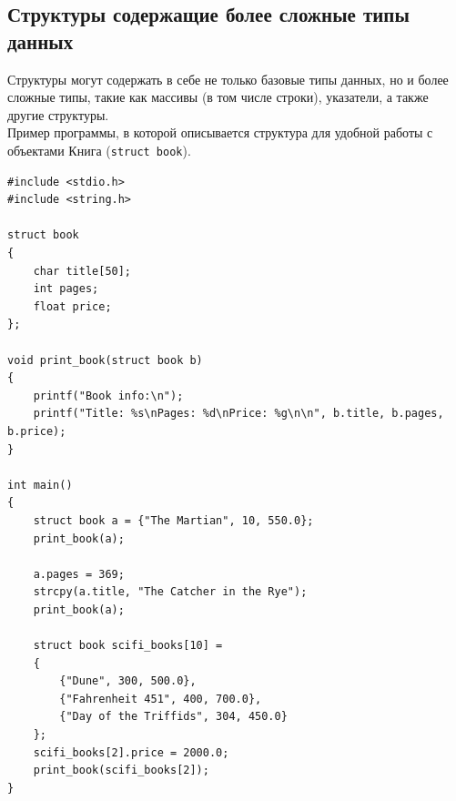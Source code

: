 \documentclass{article}
\begin{document}
\subsection*{Структуры содержащие более сложные типы данных}
Структуры могут содержать в себе не только базовые типы данных, но и более сложные типы, такие как массивы (в том числе строки), указатели, а также другие структуры.\\
Пример программы, в которой описывается структура для удобной работы с объектами Книга (\texttt{struct book}).
\begin{lstlisting}
#include <stdio.h>
#include <string.h>

struct book 
{
    char title[50];
    int pages;
    float price;
};

void print_book(struct book b) 
{
    printf("Book info:\n");
    printf("Title: %s\nPages: %d\nPrice: %g\n\n", b.title, b.pages, b.price);
}

int main() 
{
    struct book a = {"The Martian", 10, 550.0};
    print_book(a);
    
    a.pages = 369;
    strcpy(a.title, "The Catcher in the Rye");
    print_book(a);
    
    struct book scifi_books[10] = 
    {
        {"Dune", 300, 500.0}, 
        {"Fahrenheit 451", 400, 700.0},
        {"Day of the Triffids", 304, 450.0}
    };
    scifi_books[2].price = 2000.0;
    print_book(scifi_books[2]);
}
\end{lstlisting}
\newpage
\end{document}
